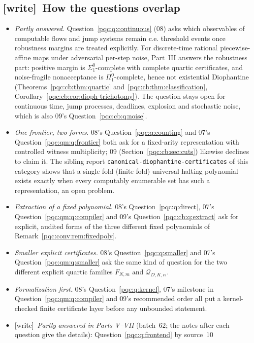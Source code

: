 \documentclass[11pt,letterpaper]{article}
\numberwithin{equation}{section}
\theoremstyle{definition}
\theoremstyle{remark}
\newcommand{\code}[1]{\nolinkurl{#1}}
\newcommand{\wtag}{\textup{[write]}}
\newcommand{\sigone}{\Sigma^0_1}
\newcommand{\pione}{\Pi^0_1}
\newcommand{\cenum}{computably enumerable}
\begin{document}
\subsection{\wtag\ How the questions overlap}
\label{pqc:conv:qoverlap}
\begin{itemize}
\item \emph{Partly answered.} Question~\ref{pqc:q:continuous} (08) asks
which observables of computable flows and jump systems remain c.e.
threshold events once robustness margins are treated explicitly. For
discrete-time rational piecewise-affine maps under adversarial per-step
noise, Part~III answers the robustness part: positive margin is
$\sigone$-complete with complete quartic certificates, and noise-fragile
nonacceptance is $\pione$-complete, hence not existential Diophantine
(Theorems~\ref{pqc:cb:thm:quartic} and~\ref{pqc:cb:thm:classification},
Corollary~\ref{pqc:cb:cor:dioph-trichotomy}). The question stays open for
continuous time, jump processes, deadlines, explosion and stochastic noise,
which is also 09's Question~\ref{pqc:cb:q:noise}.
\item \emph{One frontier, two forms.} 08's
Question~\ref{pqc:q:counting} and 07's Question~\ref{pqc:qm:q:frontier}
both ask for a fixed-arity representation with controlled witness
multiplicity; 09 (Section~\ref{pqc:cb:sec:cuts}) likewise declines to
claim it. The sibling report
\code{canonical-diophantine-certificates} of this category shows that a
single-fold (finite-fold) universal halting polynomial exists exactly when
every \cenum{} set has such a representation, an open problem.
\item \emph{Extraction of a fixed polynomial.} 08's
Question~\ref{pqc:q:direct}, 07's Question~\ref{pqc:qm:q:compiler} and 09's
Question~\ref{pqc:cb:q:extract} ask for explicit, audited forms of the three
different fixed polynomials of Remark~\ref{pqc:conv:rem:fixedpoly}.
\item \emph{Smaller explicit certificates.} 08's
Question~\ref{pqc:q:smaller} and 07's Question~\ref{pqc:qm:q:smaller} ask
the same kind of question for the two different explicit quartic families
$F_{N,m}$ and $\mathscr Q_{D,K,n}$.
\item \emph{Formalization first.} 08's Question~\ref{pqc:q:kernel}, 07's
milestone in Question~\ref{pqc:qm:q:compiler} and 09's recommended order
all put a kernel-checked finite certificate layer before any unbounded
statement.
\item \wtag\ \emph{Partly answered in Parts V--VII} (batch~62; the notes after
each question give the details): Question~\ref{pqc:q:frontend} by source~10

\end{itemize}
\end{document}
